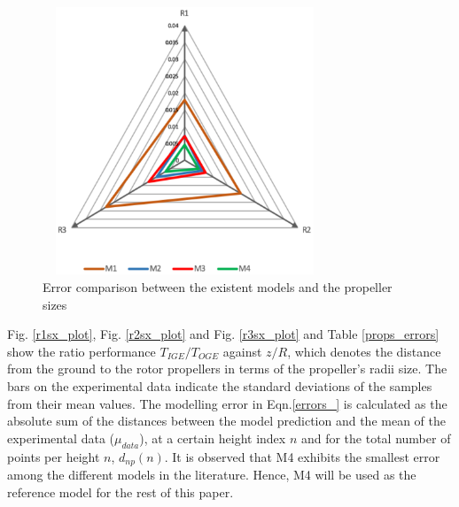 \documentclass[twocolumn,10pt]{asme2ej}
\begin{document}
\begin{figure}[t]
    \begin{center}
        \setlength{\unitlength}{0.012500in}%
        \includegraphics[width=8.5cm, height=8cm]{Images/errors_triangles.eps}
    \end{center}
  \caption{Error comparison between the existent models and the propeller sizes}
  \label{error_comp_r123}
\end{figure}

\begin{table}[!ht]
  \small\sf\centering
  \caption{Errors between the existent models and propeller sizes.}
  \label{props_errors}
\end{table}

Fig. \ref{r1sx_plot}, Fig. \ref{r2sx_plot} and Fig. \ref{r3sx_plot} and Table \ref{props_errors} show the ratio performance $T_{IGE}/T_{OGE}$ against $z/R$, which denotes the distance from the ground to the rotor propellers in terms of the propeller's radii size. The bars on the experimental data indicate the standard deviations of the samples from their mean values. The modelling error in Eqn.\eqref{errors_} is calculated as the absolute sum of the distances between the model prediction and the mean of the experimental data ($\mu_{data}$), at a certain height index $n$ and for the total number of points per height $n$, $d_{np}(n)$. It is observed that M4 exhibits the smallest error among the different models in the literature. Hence, M4 will be used as the reference model for the rest of this paper.
\end{document}
